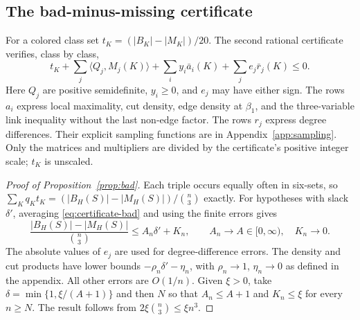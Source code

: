 \documentclass[11pt]{article}
\begin{document}
\subsection*{The bad-minus-missing certificate}
For a colored class set $t_K=(|B_K|-|M_K|)/20$. The second rational
certificate verifies, class by class,
\begin{equation}\label{eq:certificate-bad}
 t_K+\sum_j\langle Q_j,M_j(K)\rangle
       +\sum_i y_i\bar a_i(K)+\sum_j e_j\bar r_j(K)\le0.
\end{equation}
Here $Q_j$ are positive semidefinite, $y_i\ge0$, and $e_j$ may have
either sign. The rows $a_i$ express local maximality, cut density,
edge density at $\beta_1$, and the three-variable link inequality without
the last non-edge factor. The rows $r_j$ express degree differences.
Their explicit sampling functions are in Appendix~\ref{app:sampling}.
Only the matrices and multipliers are divided by the certificate's
positive integer scale; $t_K$ is unscaled.

\begin{proof}[Proof of Proposition~\ref{prop:bad}]
Each triple occurs equally often in six-sets, so
$\sum_Kq_Kt_K=(|B_H(S)|-|M_H(S)|)/\binom n3$ exactly.
For hypotheses with slack $\delta'$, averaging
\eqref{eq:certificate-bad} and using the finite errors gives
\[
 \frac{|B_H(S)|-|M_H(S)|}{\binom n3}\le A_n\delta'+K_n,
 \qquad A_n\longrightarrow A\in[0,\infty),\quad K_n\longrightarrow0.
\]
The absolute values of $e_j$ are used for degree-difference errors.
The density and cut products have lower bounds
$-\rho_n\delta'-\eta_n$, with $\rho_n\to1$, $\eta_n\to0$ as defined
in the appendix. All other errors are $O(1/n)$.
Given $\xi>0$, take $\delta=\min\{1,\xi/(A+1)\}$ and then $N$
so that $A_n\le A+1$ and $K_n\le\xi$ for every $n\ge N$.
The result follows from $2\xi\binom n3\le\xi n^3$.
\end{proof}
\end{document}

